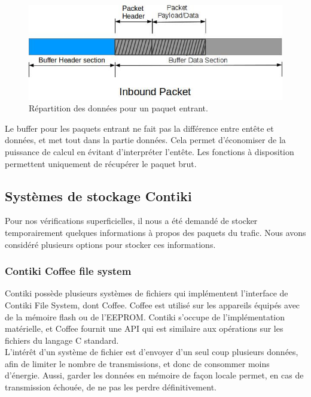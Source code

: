 			\begin{figure}[htp]
				\centering
				\includegraphics[width=13cm]{images/In.jpg}
				\caption{Répartition des données pour un paquet entrant.}
				\label{fig:inbuf}
			\end{figure}
			
			Le buffer pour les paquets entrant ne fait pas la différence entre entête et données, et met tout dans la partie données. Cela permet d'économiser de la puissance de calcul en évitant d'interpréter l'entête.
			Les fonctions à disposition permettent uniquement de récupérer le paquet brut.
	
	\subsection{Systèmes de stockage Contiki}
		
		Pour nos vérifications superficielles, il nous a été demandé de stocker temporairement quelques informations à propos des paquets du trafic. Nous avons considéré plusieurs options pour stocker ces informations.

		\subsubsection{Contiki Coffee file system}
			Contiki possède plusieurs systèmes de fichiers qui implémentent l'interface de Contiki File System, dont Coffee. Coffee est utilisé sur les appareils équipés avec de la mémoire flash ou de l'EEPROM. Contiki s'occupe de l'implémentation matérielle, et Coffee fournit une API qui est similaire aux opérations sur les fichiers du langage C standard.\\
			
			L'intérêt d'un système de fichier est d'envoyer d'un seul coup plusieurs données, afin de limiter le nombre de transmissions, et donc de consommer moins d'énergie. Aussi, garder les données en mémoire de façon locale permet, en cas de transmission échouée, de ne pas les perdre définitivement.
			
